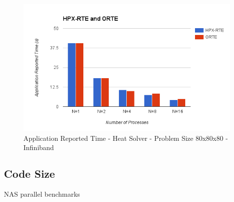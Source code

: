 \begin{figure}[h!]
\centering
\includegraphics[scale=0.7]{images/time-app-heatsolver-80-infiniband.png}
\caption[Application Reported Time - Hello World - Infiniband]{Application Reported Time - Heat Solver - Problem Size 80x80x80 - Infiniband}
\label{fig:time-app-heatsolver-80-infiniband.png}
\end{figure}


\subsection{Code Size}

NAS parallel benchmarks~\cite{bailey1991parallel}
